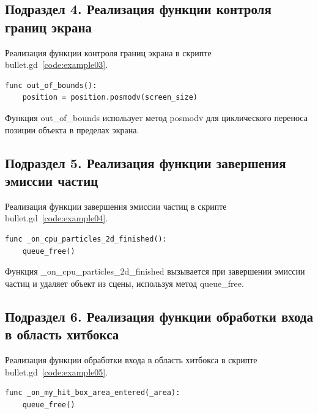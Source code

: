 \subsection{\label{subsec:ch02/sec01/sub04}Подраздел 4. Реализация функции контроля границ экрана}
Реализация функции контроля границ экрана в скрипте bullet.gd~\ref{code:example03}.
\begin{code}
\vspace{-\baselineskip}\begin{verbatim}
func out_of_bounds():
    position = position.posmodv(screen_size)
\end{verbatim}
\end{code}

Функция out\_of\_bounds использует метод posmodv для циклического переноса позиции объекта в пределах экрана.

\subsection{\label{subsec:ch02/sec01/sub05}Подраздел 5. Реализация функции завершения эмиссии частиц}
Реализация функции завершения эмиссии частиц в скрипте bullet.gd~\ref{code:example04}.
\begin{code}
\vspace{-\baselineskip}\begin{verbatim}
func _on_cpu_particles_2d_finished():
    queue_free()
\end{verbatim}
\end{code}

Функция \_on\_cpu\_particles\_2d\_finished вызывается при завершении эмиссии частиц и удаляет объект из сцены, используя метод queue\_free.

\subsection{\label{subsec:ch02/sec01/sub06}Подраздел 6. Реализация функции обработки входа в область хитбокса}
Реализация функции обработки входа в область хитбокса в скрипте bullet.gd~\ref{code:example05}.
\begin{code}
\vspace{-\baselineskip}\begin{verbatim}
func _on_my_hit_box_area_entered(_area):
    queue_free()
\end{verbatim}
\end{code}


